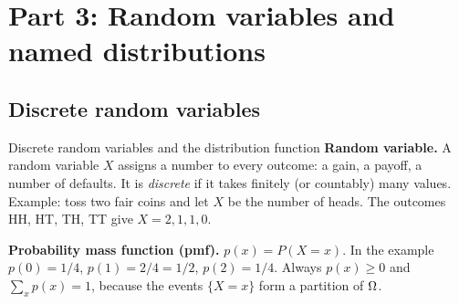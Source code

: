 
\clearpage
\section{Part 3: Random variables and named distributions}

\subsection*{Discrete random variables}

\begin{key}{Discrete random variables and the distribution function}
	\setlength{\parskip}{5pt}
	\textbf{Random variable.} A random variable $X$ assigns a number to every
	outcome: a gain, a payoff, a number of defaults. It is \emph{discrete} if
	it takes finitely (or countably) many values. Example: toss two fair
	coins and let $X$ be the number of heads. The outcomes HH, HT, TH, TT
	give $X=2,1,1,0$.

	\textbf{Probability mass function (pmf).} $p(x)=P(X=x)$. In the example
	$p(0)=1/4$, $p(1)=2/4=1/2$, $p(2)=1/4$. Always $p(x)\ge0$
	and $\sum_x p(x)=1$, because the events $\{X=x\}$ form a partition of
	$\Omega$.


\end{key}
